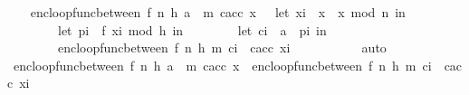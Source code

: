 \begin{isabellebody}
\ \ \isamarkupfalse%
\ {\isachardoublequoteopen}enc{\isacharunderscore}{\kern0pt}loop{\isacharunderscore}{\kern0pt}func{\isacharunderscore}{\kern0pt}between\ {\isacharparenleft}{\kern0pt}f{\isacharcomma}{\kern0pt}\ n{\isacharcomma}{\kern0pt}\ h{\isacharcomma}{\kern0pt}\ a\ {\isacharhash}{\kern0pt}\ m{\isacharparenright}{\kern0pt}\ c{\isacharunderscore}{\kern0pt}acc\ x\ {\isacharequal}{\kern0pt}\ \ {\isacharparenleft}{\kern0pt}let\ x{\isacharunderscore}{\kern0pt}i\ {\isacharequal}{\kern0pt}\ x\ {\isacharasterisk}{\kern0pt}\ x\ mod\ n\ in\isanewline
\ \ \ \ \ \ \ \ let\ p{\isacharunderscore}{\kern0pt}i\ {\isacharequal}{\kern0pt}\ f\ {\isacharparenleft}{\kern0pt}x{\isacharunderscore}{\kern0pt}i\ mod\ {}{\isacharcircum}{\kern0pt}h{\isacharparenright}{\kern0pt}\ in\isanewline
\ \ \ \ \ \ \ \ let\ c{\isacharunderscore}{\kern0pt}i\ {\isacharequal}{\kern0pt}\ a\ {\isacharbrackleft}{\kern0pt}{\isasymoplus}{\isacharbrackright}{\kern0pt}\ p{\isacharunderscore}{\kern0pt}i\ in\isanewline
\ \ \ \ \ \ \ \ enc{\isacharunderscore}{\kern0pt}loop{\isacharunderscore}{\kern0pt}func{\isacharunderscore}{\kern0pt}between\ {\isacharparenleft}{\kern0pt}f{\isacharcomma}{\kern0pt}\ n{\isacharcomma}{\kern0pt}\ h{\isacharcomma}{\kern0pt}\ m{\isacharparenright}{\kern0pt}\ {\isacharparenleft}{\kern0pt}c{\isacharunderscore}{\kern0pt}i\ {\isacharhash}{\kern0pt}\ c{\isacharunderscore}{\kern0pt}acc{\isacharparenright}{\kern0pt}\ x{\isacharunderscore}{\kern0pt}i\isanewline
\ \ \ \ \ \ \ \ {\isacharparenright}{\kern0pt}{\isachardoublequoteclose}\ \isamarkupfalse%
\ auto\isanewline
\ \ \isamarkupfalse%
\ {\isachardoublequoteopen}enc{\isacharunderscore}{\kern0pt}loop{\isacharunderscore}{\kern0pt}func{\isacharunderscore}{\kern0pt}between\ {\isacharparenleft}{\kern0pt}f{\isacharcomma}{\kern0pt}\ n{\isacharcomma}{\kern0pt}\ h{\isacharcomma}{\kern0pt}\ a\ {\isacharhash}{\kern0pt}\ m{\isacharparenright}{\kern0pt}\ c{\isacharunderscore}{\kern0pt}acc\ x\ {\isacharequal}{\kern0pt}\ enc{\isacharunderscore}{\kern0pt}loop{\isacharunderscore}{\kern0pt}func{\isacharunderscore}{\kern0pt}between\ {\isacharparenleft}{\kern0pt}f{\isacharcomma}{\kern0pt}\ n{\isacharcomma}{\kern0pt}\ h{\isacharcomma}{\kern0pt}\ m{\isacharparenright}{\kern0pt}\ {\isacharparenleft}{\kern0pt}{\isacharquery}{\kern0pt}c{\isacharunderscore}{\kern0pt}i\ {\isacharhash}{\kern0pt}\ c{\isacharunderscore}{\kern0pt}acc{\isacharparenright}{\kern0pt}\ {\isacharquery}{\kern0pt}x{\isacharunderscore}{\kern0pt}i{\isachardoublequoteclose}\ \isanewline
\ \ \ \ \isamarkupfalse%

\end{isabellebody}
